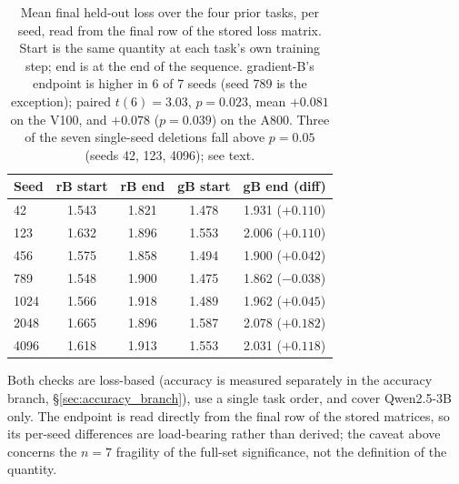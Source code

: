 \begin{table}[ht]
\caption{Mean final held-out loss over the four prior tasks, per seed, read from the final row of the stored loss matrix. Start is the same quantity at each task's own training step; end is at the end of the sequence. gradient-B's endpoint is higher in 6 of 7 seeds (seed 789 is the exception); paired $t(6)=3.03$, $p=0.023$, mean $+0.081$ on the V100, and $+0.078$ ($p=0.039$) on the A800. Three of the seven single-seed deletions fall above $p=0.05$ (seeds 42, 123, 4096); see text.}
\label{tab:d1_endpoint}
\centering
\small
\begin{tabular}{@{}lcccc@{}}
\toprule
\textbf{Seed} & \textbf{rB start} & \textbf{rB end} & \textbf{gB start} & \textbf{gB end (diff)} \\
\midrule
42   & 1.543 & 1.821 & 1.478 & 1.931 ($+0.110$) \\
123  & 1.632 & 1.896 & 1.553 & 2.006 ($+0.110$) \\
456  & 1.575 & 1.858 & 1.494 & 1.900 ($+0.042$) \\
789  & 1.548 & 1.900 & 1.475 & 1.862 ($-0.038$) \\
1024 & 1.566 & 1.918 & 1.489 & 1.962 ($+0.045$) \\
2048 & 1.665 & 1.896 & 1.587 & 2.078 ($+0.182$) \\
4096 & 1.618 & 1.913 & 1.553 & 2.031 ($+0.118$) \\
\bottomrule
\end{tabular}
\end{table}

Both checks are loss-based (accuracy is measured separately in the accuracy branch, \S\ref{sec:accuracy_branch}), use a single task order, and cover Qwen2.5-3B only. The endpoint is read directly from the final row of the stored matrices, so its per-seed differences are load-bearing rather than derived; the caveat above concerns the $n=7$ fragility of the full-set significance, not the definition of the quantity.
